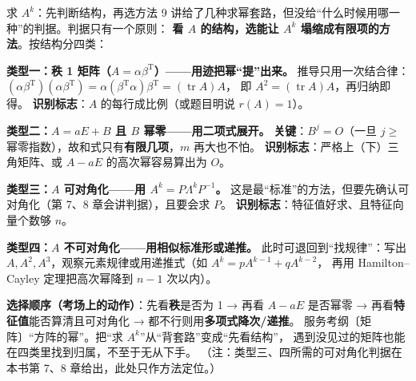 
\begin{fdeep}{求 $A^{k}$：先判断结构，再选方法}
9 讲给了几种求幂套路，但没给“什么时候用哪一种”的判据。判据只有一个原则：
\textbf{看 $A$ 的结构，选能让 $A^{k}$ 塌缩成有限项的方法}。按结构分四类：

\textbf{类型一：秩 1 矩阵（$A=\alpha\beta^{\mathrm{T}}$）——用迹把幂“提”出来。}
推导只用一次结合律：$(\alpha\beta^{\mathrm{T}})(\alpha\beta^{\mathrm{T}})
=\alpha(\beta^{\mathrm{T}}\alpha)\beta^{\mathrm{T}}=(\operatorname{tr}A)A$，
即 $A^{2}=(\operatorname{tr}A)A$，再归纳即得。
\textbf{识别标志}：$A$ 的每行成比例（或题目明说 $r(A)=1$）。

\textbf{类型二：$A=aE+B$ 且 $B$ 幂零——用二项式展开。}
\textbf{关键}：$B^{j}=O$（一旦 $j\ge$ 幂零指数），故和式只有\textbf{有限几项}，$m$ 再大也不怕。
\textbf{识别标志}：严格上（下）三角矩阵、或 $A-aE$ 的高次幂容易算出为 $O$。

\textbf{类型三：$A$ 可对角化——用 $A^{k}=P\Lambda^{k}P^{-1}$。}
这是最“标准”的方法，但要先确认可对角化（第 7、8 章会讲判据），且要会求 $P$。
\textbf{识别标志}：特征值好求、且特征向量个数够 $n$。

\textbf{类型四：$A$ 不可对角化——用相似标准形或递推。}
此时可退回到“找规律”：写出 $A,A^{2},A^{3}$，观察元素规律或用递推式（如 $A^{k}=pA^{k-1}+qA^{k-2}$，
再用 Hamilton–Cayley 定理把高次幂降到 $n-1$ 次以内）。

\medskip
\textbf{选择顺序（考场上的动作）}：先看\textbf{秩}是否为 1 → 再看 $A-aE$ 是否幂零 →
再看\textbf{特征值}能否算清且可对角化 → 都不行则用\textbf{多项式降次/递推}。
\fbref{}服务考纲〔矩阵〕“方阵的幂”。把“求 $A^{k}$”从“背套路”变成“先看结构”，
遇到没见过的矩阵也能在四类里找到归属，不至于无从下手。
（注：类型三、四所需的可对角化判据在本书第 7、8 章给出，此处只作方法定位。）
\end{fdeep}


